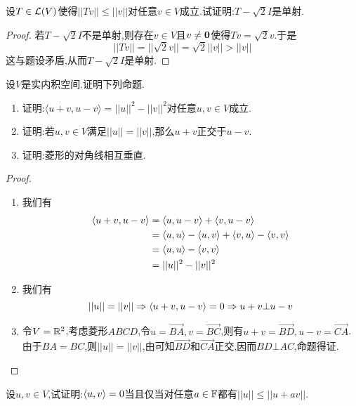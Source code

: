 \documentclass{ctexart}
\begin{document}
\begin{problem}[4.]
    设$T\in\mathcal{L}(V)$使得$||Tv||\leqslant||v||$对任意$v\in V$成立.试证明:$T-\sqrt2I$是单射.
\end{problem}
\begin{proof}
    若$T-\sqrt2I$不是单射,则存在$v\in V$且$v\neq\mathbf0$使得$Tv=\sqrt2v$.于是
    \[||Tv||=||\sqrt2v||=\sqrt2||v||>||v||\]
    这与题设矛盾,从而$T-\sqrt2I$是单射.
\end{proof}
\begin{problem}[5.]
    设$V$是实内积空间.证明下列命题.
    \begin{enumerate}[label=\tbf{(\arabic*)}]
        \item 证明:$\langle u+v,u-v\rangle=||u||^2-||v||^2$对任意$u,v\in V$成立.
        \item 证明:若$u,v\in V$满足$||u||=||v||$,那么$u+v$正交于$u-v$.
        \item 证明:菱形的对角线相互垂直.
    \end{enumerate}
\end{problem}
\begin{proof}
    \begin{enumerate}[label=\tbf{(\arabic*)}]
        \item 我们有
            \[\begin{aligned}
                \langle u+v,u-v\rangle
                &= \langle u,u-v\rangle+\langle v,u-v\rangle \\
                &= \langle u,u\rangle-\langle u,v\rangle+\langle v,u\rangle-\langle v,v\rangle \\
                &= \langle u,u\rangle-\left\langle{v},{v}\right\rangle \\
                &= ||u||^2-||v||^2
            \end{aligned}\]
        \item 我们有
            \[||u||=||v||\Rightarrow \left\langle{u+v},{u-v}\right\rangle=0\Rightarrow u+v\bot u-v\]
        \item 令$V=\mathbb{R}^2$,考虑菱形$ABCD$,令$u=\overrightarrow{BA},v=\overrightarrow{BC}$,则有$u+v=\overrightarrow{BD},u-v=\overrightarrow{CA}$.\\
            由于$BA=BC$,则$||u||=||v||$,由可知$\overrightarrow{BD}$和$\overrightarrow{CA}$正交,因而$BD\bot AC$,命题得证.
    \end{enumerate}
\end{proof}
\begin{problem}[6.]
    设$u,v\in V$,试证明:$\left\langle{u},{v}\right\rangle=0$当且仅当对任意$a\in\mathbb{F}$都有$||u||\leqslant||u+av||$.
\end{problem}
\end{document}
